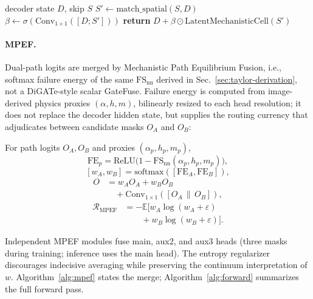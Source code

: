 \begin{algorithm}[htbp]
\caption{Physics-Gated Decoder Injection (PGDI)}
\label{alg:pgdi}
\begin{algorithmic}
\Require decoder state \(D\), skip \(S\)
\State \(S'\leftarrow\mathrm{match\_spatial}(S,D)\)
\State \(\beta\leftarrow\sigma(\mathrm{Conv}_{1\times1}([D;S']))\)
\State \textbf{return} \(D+\beta\odot\mathrm{LatentMechanisticCell}(S')\)
\end{algorithmic}
\end{algorithm}

\paragraph{MPEF.}
Dual-path logits are merged by Mechanistic Path Equilibrium Fusion, i.e., softmax failure energy of the same \(\mathrm{FS}_{\mathrm{nn}}\) derived in Sec.~\ref{sec:taylor-derivation}, not a DiGATe-style scalar GateFuse. Failure energy is computed from image-derived physics proxies \((\alpha,h,m)\), bilinearly resized to each head resolution; it does not replace the decoder hidden state, but supplies the routing currency that adjudicates between candidate masks \(O_A\) and \(O_B\):
\begin{definition}[MPEF]
\label{def:mpef}
For path logits \(O_A,O_B\) and proxies \((\alpha_p,h_p,m_p)\),
\begin{equation}
\label{eq:mpef-fe}
\mathrm{FE}_p
=\mathrm{ReLU}\bigl(
1-\mathrm{FS}_{\mathrm{nn}}(\alpha_p,h_p,m_p)
\bigr),
\end{equation}
\begin{equation}
\label{eq:mpef-w}
[w_A,w_B]
=\mathrm{softmax}([\mathrm{FE}_A,\mathrm{FE}_B]),
\end{equation}
\begin{equation}
\label{eq:mpef-o}
\begin{split}
O
&=
w_A O_A+w_B O_B\\
&\quad{}+
\mathrm{Conv}_{1\times1}([O_A\,\|\,O_B]),
\end{split}
\end{equation}
\begin{equation}
\label{eq:mpef-r}
\begin{split}
\mathcal{R}_{\mathrm{MPEF}}
&=
-\mathbb{E}\bigl[
w_A\log(w_A+\varepsilon)\\
&\qquad{}+
w_B\log(w_B+\varepsilon)
\bigr].
\end{split}
\end{equation}
\end{definition}
Independent MPEF modules fuse main, aux2, and aux3 heads (three masks during training; inference uses the main head). The entropy regularizer discourages indecisive averaging while preserving the continuum interpretation of \(w\). Algorithm~\ref{alg:mpef} states the merge; Algorithm~\ref{alg:forward} summarizes the full forward pass.

